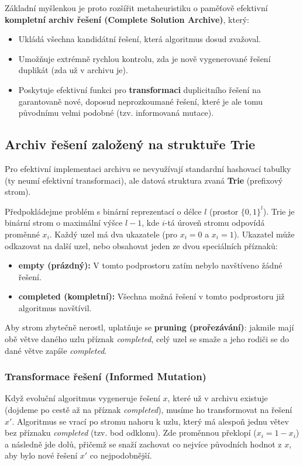 \documentclass[12pt,a4paper]{article}
\theoremstyle{definition}
\begin{document}
Základní myšlenkou je proto rozšířit metaheuristiku o paměťově efektivní \textbf{kompletní archiv řešení (Complete Solution Archive)}, který:
\begin{itemize}
    \item Ukládá všechna kandidátní řešení, která algoritmus dosud zvažoval.
    \item Umožňuje extrémně rychlou kontrolu, zda je nově vygenerované řešení duplikát (zda už v archivu je).
    \item Poskytuje efektivní funkci pro \textbf{transformaci} duplicitního řešení na garantovaně nové, doposud neprozkoumané řešení, které je ale tomu původnímu velmi podobné (tzv. informovaná mutace).
\end{itemize}

\subsection{Archiv řešení založený na struktuře Trie}
Pro efektivní implementaci archivu se nevyužívají standardní hashovací tabulky (ty neumí efektivní transformaci), ale datová struktura zvaná \textbf{Trie} (prefixový strom).

Předpokládejme problém s binární reprezentací o délce $l$ (prostor $\{0,1\}^l$). Trie je binární strom o maximální výšce $l-1$, kde $i$-tá úroveň stromu odpovídá proměnné $x_i$. Každý uzel má dva ukazatele (pro $x_i = 0$ a $x_i = 1$). Ukazatel může odkazovat na další uzel, nebo obsahovat jeden ze dvou speciálních příznaků:
\begin{itemize}
    \item \textbf{empty (prázdný):} V tomto podprostoru zatím nebylo navštíveno žádné řešení.
    \item \textbf{completed (kompletní):} Všechna možná řešení v tomto podprostoru již algoritmus navštívil.
\end{itemize}
Aby strom zbytečně nerostl, uplatňuje se \textbf{pruning (prořezávání)}: jakmile mají obě větve daného uzlu příznak \textit{completed}, celý uzel se smaže a jeho rodiči se do dané větve zapíše \textit{completed}.

\subsubsection{Transformace řešení (Informed Mutation)}
Když evoluční algoritmus vygeneruje řešení $x$, které už v archivu existuje (dojdeme po cestě až na příznak \textit{completed}), musíme ho transformovat na řešení $x'$. Algoritmus se vrací po stromu nahoru k uzlu, který má alespoň jednu větev bez příznaku \textit{completed} (tzv. bod odklonu). Zde proměnnou překlopí ($x_i = 1 - x_i$) a následně jde dolů, přičemž se snaží zachovat co nejvíce původních hodnot z $x$, aby bylo nové řešení $x'$ co nejpodobnější.
\end{document}
